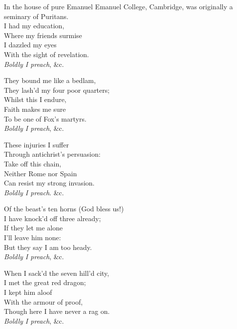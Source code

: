 \settowidth{\versewidth}{In the house of pure Emanuel}
\begin{dcverse}
\begin{patverse}
In the house of pure Emanuel\scfootnote
{Emanuel College, Cambridge, was originally a seminary of Puritans.}\\
I had my education,\\
Where my friends surmise\\
I dazzled my eyes\\
With the sight of revelation.\\
\textit{Boldly I preach}, \&c.
\end{patverse}

\begin{patverse}
They bound me like a bedlam,\\
They lash’d my four poor quarters;\\
Whilst this I endure,\\
Faith makes me sure\\
To be one of Fox’s martyrs.\\
\textit{Boldly I preach}, \&c.
\end{patverse}

\begin{patverse}
These injuries I suffer\\
Through antichrist’s persuasion:\\
Take off this chain,\\
Neither Rome nor Spain\\
Can resist my strong invasion.\\
\textit{Boldly I preach}. \&c.
\end{patverse}

\begin{patverse}
Of the beast’s ten horns (God bless us!)\\
I have knock’d off three already;\\
If they let me alone\\
I’ll leave him none:\\
But they say I am too heady.\\
\textit{Boldly I preach}, \&c.
\end{patverse}

\begin{patverse}
When I sack’d the seven hill’d city,\\
I met the great red dragon;\\
I kept him aloof\\
With the armour of proof,\\
Though here I have never a rag on.\\
\textit{Boldly I preach}, \&c.
\end{patverse}


\end{dcverse}
